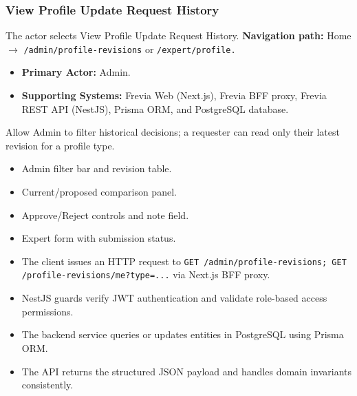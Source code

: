 \subsubsection{View Profile Update Request History}

The actor selects View Profile Update Request History.\newline
\textbf{Navigation path:} Home $\rightarrow$ \texttt{/\allowbreak{}admin/\allowbreak{}profile-\allowbreak{}revisions} or \texttt{/\allowbreak{}expert/\allowbreak{}profile.}


\begin{itemize}[leftmargin=1.6em,topsep=3pt,itemsep=2pt,parsep=0pt,label=$\bullet$]
    \item \textbf{Primary Actor:} Admin.
    \item \textbf{Supporting Systems:} Frevia Web (Next.js), Frevia BFF proxy, Frevia REST API (NestJS), Prisma ORM, and PostgreSQL database.
\end{itemize}

\noindent Allow Admin to filter historical decisions; a requester can read only their latest revision for a profile type.

\begin{itemize}[leftmargin=1.6em,topsep=3pt,itemsep=2pt,parsep=0pt,label=$\bullet$]
    \item Admin filter bar and revision table.
    \item Current/proposed comparison panel.
    \item Approve/Reject controls and note field.
    \item Expert form with submission status.
\end{itemize}

\begin{itemize}[leftmargin=1.6em,topsep=3pt,itemsep=2pt,parsep=0pt,label=$\bullet$]
    \item The client issues an HTTP request to \texttt{GET /\allowbreak{}admin/\allowbreak{}profile-\allowbreak{}revisions; GET /\allowbreak{}profile-\allowbreak{}revisions/\allowbreak{}me?type=...} via Next.js BFF proxy.
    \item NestJS guards verify JWT authentication and validate role-based access permissions.
    \item The backend service queries or updates entities in PostgreSQL using Prisma ORM.
    \item The API returns the structured JSON payload and handles domain invariants consistently.
\end{itemize}

